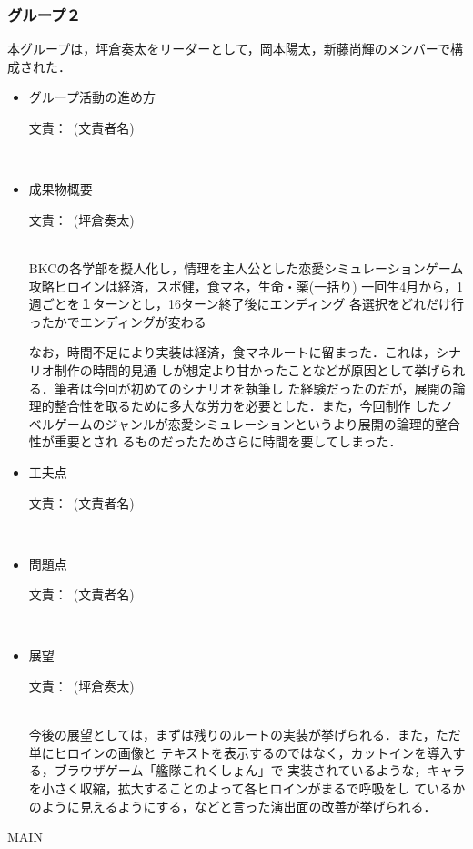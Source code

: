 \documentclass[a4paper]{jarticle}
\newcommand{\resp}[1]{\begin{flushright}文責：~#1\end{flushright}~\\}
\begin{document}
\fi

\subsubsection{グループ２}
    
    本グループは，坪倉奏太をリーダーとして，岡本陽太，新藤尚輝のメンバーで構成された．

    \begin{itemize}
        \item グループ活動の進め方
        
        \resp{(文責者名)}


        \item 成果物概要
        
        \resp{(坪倉奏太)}

        BKCの各学部を擬人化し，情理を主人公とした恋愛シミュレーションゲーム
	攻略ヒロインは経済，スポ健，食マネ，生命・薬(一括り)
	一回生4月から，1週ごとを１ターンとし，16ターン終了後にエンディング
	各選択をどれだけ行ったかでエンディングが変わる

	なお，時間不足により実装は経済，食マネルートに留まった．これは，シナリオ制作の時間的見通	しが想定より甘かったことなどが原因として挙げられる．筆者は今回が初めてのシナリオを執筆し	た経験だったのだが，展開の論理的整合性を取るために多大な労力を必要とした．また，今回制作	したノベルゲームのジャンルが恋愛シミュレーションというより展開の論理的整合性が重要とされ	るものだったためさらに時間を要してしまった．


        \item 工夫点
        
        \resp{(文責者名)}


        \item 問題点
        
        \resp{(文責者名)}


        \item 展望
        
        \resp{(坪倉奏太)}

        今後の展望としては，まずは残りのルートの実装が挙げられる．また，ただ単にヒロインの画像と	テキストを表示するのではなく，カットインを導入する，ブラウザゲーム「艦隊これくしょん」で	実装されているような，キャラを小さく収縮，拡大することのよって各ヒロインがまるで呼吸をし	ているかのように見えるようにする，などと言った演出面の改善が挙げられる．

    \end{itemize}

\expandafter\ifx\csname MAIN \endcsname\relax
  
\end{document}
